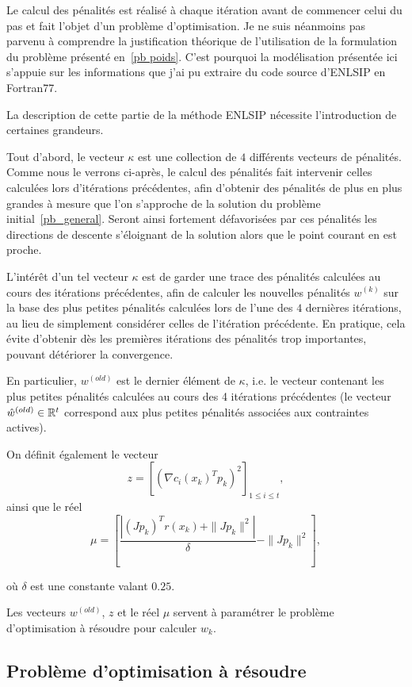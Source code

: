 Le calcul des pénalités est réalisé à chaque itération avant de commencer celui du pas et fait l'objet d'un problème d'optimisation. Je ne suis néanmoins pas parvenu
à comprendre la justification théorique de l'utilisation de la formulation du problème présenté en~\eqref{pb poids}. C'est pourquoi la modélisation présentée ici
s'appuie sur les informations que j'ai pu extraire du code source d'ENLSIP en Fortran77.

La description de cette partie de la méthode ENLSIP nécessite l'introduction de certaines grandeurs.

Tout d'abord, le vecteur $\kappa$ est une collection de $4$ différents vecteurs de pénalités. 
Comme nous le verrons ci-après, le calcul des pénalités fait intervenir celles calculées lors d'itérations précédentes, afin d'obtenir des pénalités de plus en plus 
grandes à mesure que l'on s'approche de la solution du problème initial~\ref{pb_general}. Seront ainsi fortement défavorisées par ces pénalités les directions de descente 
s'éloignant de la solution alors que le point courant en est proche.


L'intérêt d'un tel vecteur $\kappa$ est de garder une trace des pénalités calculées au cours des itérations précédentes, afin de calculer les nouvelles pénalités 
$w^{(k)}$ sur la base des plus petites pénalités calculées lors de l'une des $4$ dernières itérations, au lieu de simplement considérer celles de l'itération précédente. 
En pratique, cela évite d'obtenir dès les premières itérations des pénalités trop importantes, pouvant détériorer la convergence.

En particulier, $w^{(old)}$ est le dernier élément de $\kappa$, i.e. le vecteur contenant les plus petites pénalités calculées au cours des 4 itérations précédentes 
(le vecteur $\hat{w}^{(old)}\in\mathbb{R}^t$ correspond aux plus petites pénalités associées aux contraintes actives).

On définit également le vecteur $$z=\left[(\nabla c_i(x_{k})^Tp_{k})^2 \right]_{1 \leq i \leq t},$$ ainsi que le réel 
\[\mu =  \left[\dfrac{|(Jp_{k})^Tr(x_k) + \|Jp_{k}\|^2|}{\delta} - \|Jp_{k}\|^2 \right],\] 

où $\delta$ est une constante valant $0.25$.

Les vecteurs $w^{(old)}$, $z$ et le réel $\mu$ servent à paramétrer le problème d'optimisation à résoudre pour calculer $w_{k}$.

\subsection*{Problème d'optimisation à résoudre}

